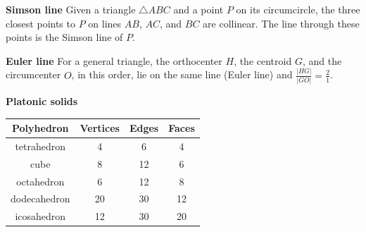 \textbf{Simson line}
Given a triangle $\triangle ABC$ and a point $P$ on its circumcircle,
the three closest points to $P$ on lines $AB$, $AC$, and $BC$ are collinear.
The line through these points is the Simson line of $P$.

\textbf{Euler line}
For a general triangle, the orthocenter $H$, the centroid $G$, 
and the circumcenter $O$, in this order, lie on the same line (Euler line) 
and $\frac{|HG|}{|GO|} = \frac{2}{1}$.



\textbf{Platonic solids}
\begin{tabular}{ |c|c|c|c| } 
\hline
Polyhedron & Vertices & Edges & Faces \\ 
\hline
tetrahedron & 4 & 6 & 4 \\ 
\hline
cube & 8 & 12 & 6 \\ 
\hline
octahedron & 6 & 12 & 8 \\
\hline
dodecahedron & 20 & 30 & 12 \\
\hline
icosahedron & 12 & 30 & 20 \\
\hline
\end{tabular}
 
